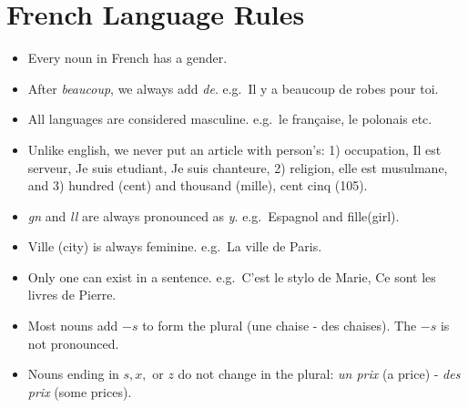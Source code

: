 \section{French Language Rules}

\begin{itemize}

\item{Every noun in French has a gender.}

\item{After \emph{beaucoup}, we always add \emph{de}. e.g.\ Il y a beaucoup de
robes pour toi.}

\item{All languages are considered masculine. e.g.\ le fran\c{c}aise, le polonais
etc.}

\item{Unlike english, we never put an article with person's:
1) occupation, Il est serveur, Je suis etudiant, Je suis chanteure,
2) religion, elle est musulmane, and
3) hundred (cent) and thousand (mille), cent cinq (105).}

\item{\emph{gn} and \emph{ll} are always pronounced as \emph{y}. e.g.\ Espagnol and fille(girl).}

\item{Ville (city) is always feminine. e.g.\ La ville de Paris.}

\item{Only one can exist in a sentence. e.g.\ C'est le stylo de Marie, Ce sont les livres de Pierre.}

\item{Most nouns add $-s$ to form the plural (une chaise - des chaises).
The $-s$ is not pronounced.}

\item{Nouns ending in $s, x,$ or $z$ do not change in the plural:
\emph{un prix} (a price) - \emph{des prix} (some prices).}

\end{itemize}
